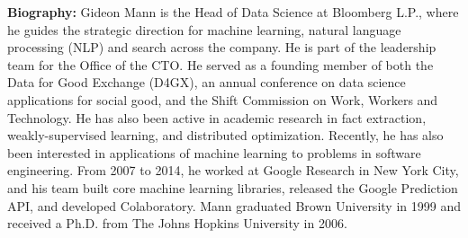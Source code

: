{\bfseries Biography:} Gideon Mann is the Head of Data Science at Bloomberg L.P., where he guides the strategic direction for machine learning, natural language processing (NLP) and search across the company. He is part of the leadership team for the Office of the CTO. He served as a founding member of both the Data for Good Exchange (D4GX), an annual conference on data science applications for social good, and the Shift Commission on Work, Workers and Technology. He has also been active in academic research in fact extraction, weakly-supervised learning, and distributed optimization. Recently, he has also been interested in applications of machine learning to problems in software engineering. From 2007 to 2014, he worked at Google Research in New York City, and his team built core machine learning libraries, released the Google Prediction API, and developed Colaboratory. Mann graduated Brown University in 1999 and received a Ph.D. from The Johns Hopkins University in 2006.

\newpage
